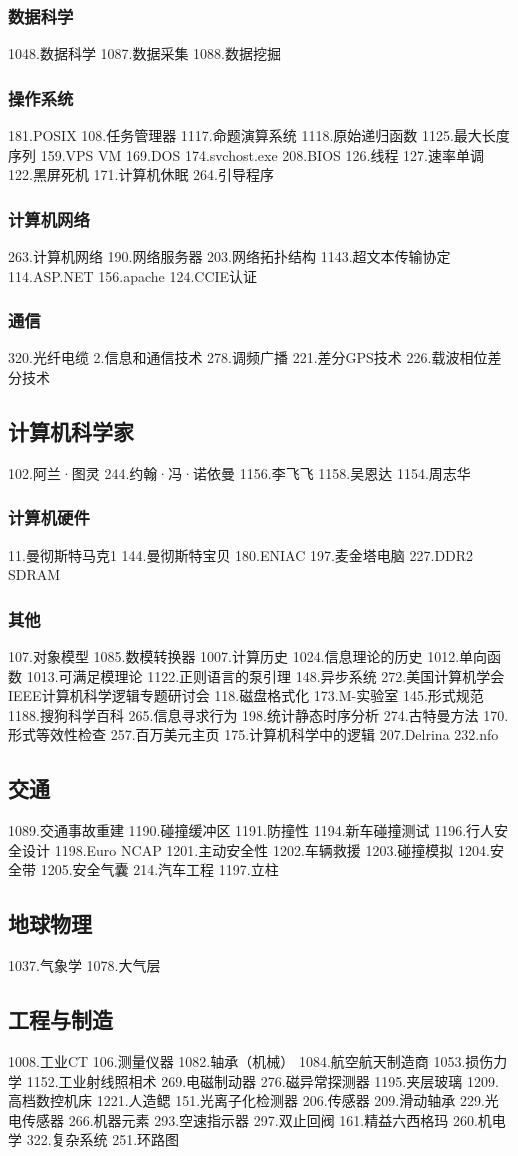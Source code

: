 \subsubsection{数据科学}
1048.数据科学
1087.数据采集
1088.数据挖掘
\subsubsection{操作系统}
181.POSIX
108.任务管理器
1117.命题演算系统
1118.原始递归函数
1125.最大长度序列
159.VPS VM
169.DOS
174.svchost.exe
208.BIOS
126.线程
127.速率单调
122.黑屏死机
171.计算机休眠
264.引导程序
\subsubsection{计算机网络}
263.计算机网络
190.网络服务器
203.网络拓扑结构
1143.超文本传输协定
114.ASP.NET
156.apache
124.CCIE认证
\subsubsection{通信}
320.光纤电缆
2.信息和通信技术
278.调频广播
221.差分GPS技术
226.载波相位差分技术
\subsection{计算机科学家}
102.阿兰·图灵
244.约翰·冯·诺依曼
1156.李飞飞
1158.吴恩达
1154.周志华
\subsubsection{计算机硬件}
11.曼彻斯特马克1
144.曼彻斯特宝贝
180.ENIAC 197.麦金塔电脑
227.DDR2 SDRAM
\subsubsection{其他}
107.对象模型
1085.数模转换器
1007.计算历史
1024.信息理论的历史
1012.单向函数
1013.可满足模理论
1122.正则语言的泵引理
148.异步系统
272.美国计算机学会IEEE计算机科学逻辑专题研讨会
118.磁盘格式化
173.M-实验室
145.形式规范
1188.搜狗科学百科
265.信息寻求行为
198.统计静态时序分析
274.古特曼方法
170.形式等效性检查
257.百万美元主页
175.计算机科学中的逻辑
207.Delrina
232.nfo

\subsection{交通}
1089.交通事故重建
1190.碰撞缓冲区
1191.防撞性
1194.新车碰撞测试
1196.行人安全设计
1198.Euro NCAP
1201.主动安全性
1202.车辆救援
1203.碰撞模拟
1204.安全带
1205.安全气囊
214.汽车工程
1197.立柱

\subsection{地球物理}
1037.气象学
1078.大气层

\subsection{工程与制造}
1008.工业CT
106.测量仪器
1082.轴承（机械）
1084.航空航天制造商
1053.损伤力学
1152.工业射线照相术
269.电磁制动器
276.磁异常探测器
1195.夹层玻璃
1209.高档数控机床
1221.人造鳃
151.光离子化检测器
206.传感器
209.滑动轴承
229.光电传感器
266.机器元素
293.空速指示器
297.双止回阀
161.精益六西格玛
260.机电学
322.复杂系统
251.环路图
